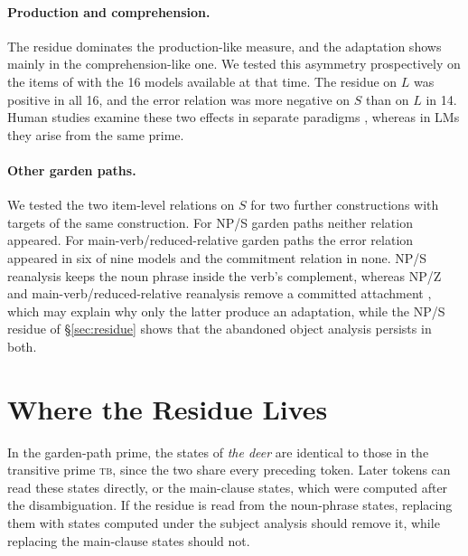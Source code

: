 \documentclass[11pt]{article}
\newcommand{\ex}[1]{\textit{#1}}
\newcommand{\cond}[1]{\textsc{#1}}
\begin{document}
\paragraph{Production and comprehension.}
The residue dominates the production-like measure, and the adaptation shows mainly in the comprehension-like one.
We tested this asymmetry prospectively on the items of \citet{christianson2001} with the 16 models available at that time.
The residue on $L$ was positive in all 16, and the error relation was more negative on $S$ than on $L$ in 14.
Human studies examine these two effects in separate paradigms \citep{vangompel2006,fine2013}, whereas in LMs they arise from the same prime.

\paragraph{Other garden paths.}
We tested the two item-level relations on $S$ for two further constructions with targets of the same construction.
For NP/S garden paths neither relation appeared.
For main-verb/reduced-relative garden paths the error relation appeared in six of nine models and the commitment relation in none.
NP/S reanalysis keeps the noun phrase inside the verb's complement, whereas NP/Z and main-verb/reduced-relative reanalysis remove a committed attachment \citep{sturt1996}, which may explain why only the latter produce an adaptation, while the NP/S residue of \S\ref{sec:residue} shows that the abandoned object analysis persists in both.

\section{Where the Residue Lives}
\label{sec:mechanism}

In the garden-path prime, the states of \ex{the deer} are identical to those in the transitive prime \cond{tb}, since the two share every preceding token.
Later tokens can read these states directly, or the main-clause states, which were computed after the disambiguation.
If the residue is read from the noun-phrase states, replacing them with states computed under the subject analysis should remove it, while replacing the main-clause states should not.
\end{document}
